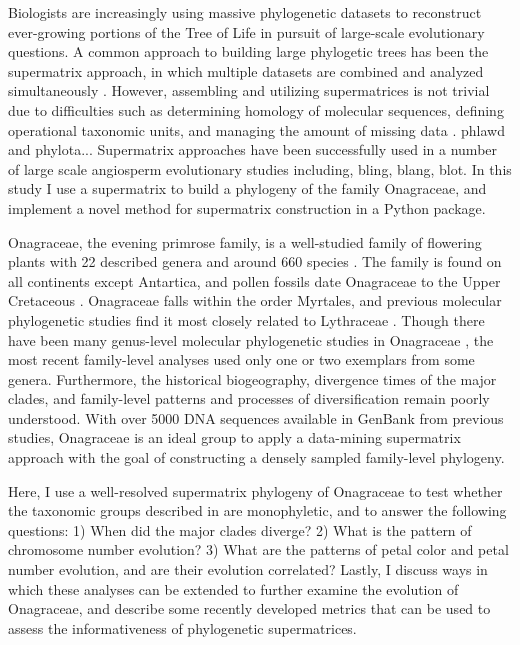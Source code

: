\documentclass[review]{elsarticle}
\begin{document}
Biologists are increasingly using massive phylogenetic
datasets to reconstruct ever-growing portions of the Tree of Life 
in pursuit of large-scale evolutionary questions.
A common approach to building large phylogetic trees has been
the supermatrix approach, in which multiple datasets are
combined and analyzed simultaneously \citep{DeQueiroz2007}.
However, assembling and utilizing supermatrices is not trivial
due to difficulties such as determining homology of molecular
sequences, defining operational taxonomic units, 
and managing the amount of missing data \citep{Roure2007, Yan2005}.
phlawd and phylota...
Supermatrix approaches have been successfully used in a number
of large scale angiosperm evolutionary studies including, bling, blang, blot.
In this study I use a supermatrix to build a phylogeny of
the family Onagraceae, and implement a novel method for supermatrix
construction in a Python package.

Onagraceae, the evening primrose family, is a well-studied family
of flowering plants with 22 described genera and around 660 species \citep{wagner2007revised}.
The family is found on all continents except Antartica,
and pollen fossils date Onagraceae to the Upper Cretaceous \citep{grimsson}.
Onagraceae falls within the order Myrtales,
and previous molecular phylogenetic studies find it most closely related to Lythraceae \citep{conti1997, Sytsma2004}.
Though there have been many genus-level molecular phylogenetic studies in Onagraceae
\citep{Berry2004, Evans2009, Hoggard2004, Xie2009, Baum1994, Wagner2005}, 
the most recent family-level analyses \citep{Levin2003, Levin2004}
used only one or two exemplars from some genera. 
Furthermore, the historical biogeography, divergence times of the major clades, and 
family-level patterns and processes of diversification remain poorly understood.
With over 5000 DNA sequences available in GenBank from previous studies, Onagraceae is an
ideal group to apply a data-mining supermatrix approach
with the goal of constructing a densely sampled family-level phylogeny.

Here, I use a well-resolved supermatrix phylogeny of Onagraceae to
test whether the taxonomic groups described in \citet{wagner2007revised} are monophyletic,
and to answer the following questions:
1) When did the major clades diverge?
2) What is the pattern of chromosome number evolution?
3) What are the patterns of petal color and petal number evolution, and are their 
evolution correlated?
Lastly, I discuss ways in which these analyses can be extended
to further examine the evolution of Onagraceae, 
and describe some recently developed metrics that can
be used to assess the informativeness of phylogenetic supermatrices.
\end{document}
